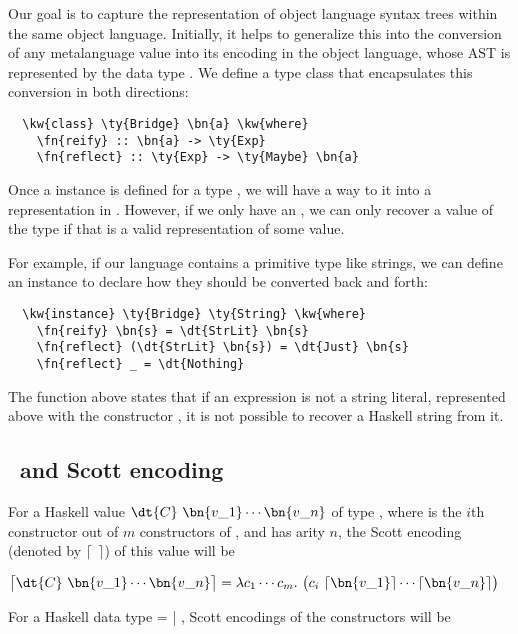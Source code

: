 Our goal is to capture the representation of object language syntax trees within the same object language. Initially, it helps to generalize this into the conversion of any metalanguage value into its encoding
in the object language, whose AST is represented by the data type .
We define a type class that encapsulates this conversion in both directions:
\begin{Verbatim}
  \kw{class} \ty{Bridge} \bn{a} \kw{where}
    \fn{reify} :: \bn{a} -> \ty{Exp}
    \fn{reflect} :: \ty{Exp} -> \ty{Maybe} \bn{a}
\end{Verbatim}
Once a  instance is defined for a type , we will have a way to  it into a representation in . However, if we only have an , we can only recover a value of the type  if that  is a valid representation of some value.

For example, if our language contains a primitive type like strings, we can define an instance to declare how they should be converted back and forth:
\begin{Verbatim}
  \kw{instance} \ty{Bridge} \ty{String} \kw{where}
    \fn{reify} \bn{s} = \dt{StrLit} \bn{s}
    \fn{reflect} (\dt{StrLit} \bn{s}) = \dt{Just} \bn{s}
    \fn{reflect} _ = \dt{Nothing}
\end{Verbatim}
The  function above states that if an expression is not a string
literal, represented above with the constructor , it is not possible
to recover a Haskell string from it.

\subsection{\Lc\ and Scott encoding}

\newcommand{\enco}[1]{\lceil #1 \rceil}
\newcommand{\benco}[1]{\big\lceil #1 \big\rceil}


For a Haskell value $\dt{C}\ \bn{v\_1} \cdots \bn{v\_n}$ of type ,
where  is the $i$th constructor out of $m$ constructors of ,
and  has arity $n$, the Scott encoding (denoted by $\enco{\ \ }$) of this value will be
\begin{center}
$\benco{\dt{C}\ \bn{v\_1} \cdots \bn{v\_n}} = \lambda c_1 \cdots c_m.\ \big(c_i\ \enco{\bn{v\_1}} \cdots \enco{\bn{v\_n}}\big)$
\end{center}

For a Haskell data type   =  | ,
Scott \mbox{encodings} of the constructors will be

